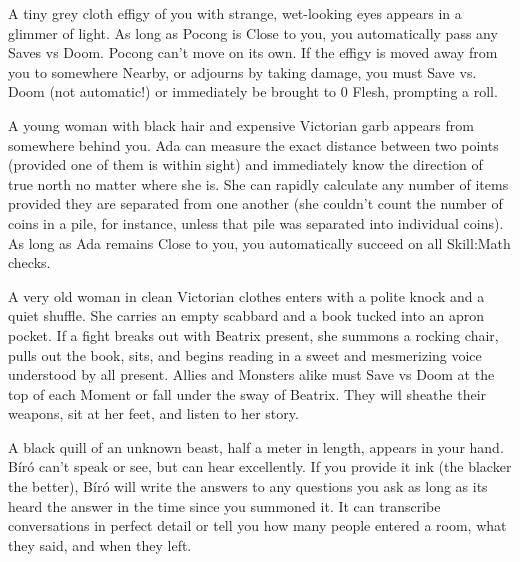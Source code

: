 {

A tiny grey cloth effigy of you with strange, wet-looking eyes appears in a glimmer of light.  As long as Pocong is Close to you, you automatically pass any Saves vs Doom.  Pocong can't move on its own.  If the effigy is moved away from you to somewhere Nearby, or adjourns by taking damage, you must Save vs. Doom (not automatic!) or immediately be brought to 0 Flesh, prompting a \DEATH roll.






A young woman with black hair and expensive Victorian garb appears from somewhere behind you.  Ada can measure the exact distance between two points (provided one of them is within sight) and immediately know the direction of true north no matter where she is.  She can rapidly calculate any number of items provided they are separated from one another (she couldn't count the number of coins in a pile, for instance, unless that pile was separated into individual coins).  As long as Ada remains Close to you, you automatically succeed on all Skill:Math checks.




A very old woman in clean Victorian clothes enters with a polite knock and a quiet shuffle.  She carries an empty scabbard and a book tucked into an apron pocket.  If a fight breaks out with Beatrix present, she summons a rocking chair, pulls out the book, sits, and begins reading in a sweet and mesmerizing voice understood by all present.  Allies and Monsters alike must Save vs Doom at the top of each Moment or fall under the sway of Beatrix.  They will sheathe their weapons, sit at her feet, and listen to her story.


A black quill of an unknown beast, half a meter in length, appears in your hand.  Bíró can't speak or see, but can hear excellently.  If you provide it ink (the blacker the better), Bíró will write the answers to any questions you ask as long as its heard the answer in the time since you summoned it.  It can transcribe conversations in perfect detail or tell you how many people entered a room, what they said, and when they left.

}
